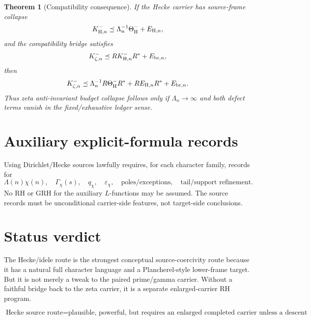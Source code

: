\documentclass[11pt]{article}
\newtheorem{theorem}{Theorem}
\begin{document}
\begin{theorem}[Compatibility consequence]
If the Hecke carrier has source-frame collapse
\[
K_{{\rm H},n}^-\preceq \Lambda_n^{-1}\Theta_{\rm H}^-+E_{{\rm H},n},
\]
and the compatibility bridge satisfies
\[
K_{\zeta,n}^-\preceq R K_{{\rm H},n}^-R^*+E_{{\rm br},n},
\]
then
\[
K_{\zeta,n}^-\preceq
\Lambda_n^{-1}R\Theta_{\rm H}^-R^*
+R E_{{\rm H},n}R^*+E_{{\rm br},n}.
\]
Thus zeta anti-invariant budget collapse follows only if \(\Lambda_n\to\infty\) and both defect terms vanish in the fixed/exhaustive ledger sense.
\end{theorem}

\section{Auxiliary explicit-formula records}
Using Dirichlet/Hecke sources lawfully requires, for each character family, records for
\[
\Lambda(n)\chi(n),\quad
\Gamma_\chi(s),\quad
q_\chi,\quad
\varepsilon_\chi,\quad
\text{poles/exceptions},\quad
\text{tail/support refinement}.
\]
No RH or GRH for the auxiliary \(L\)-functions may be assumed.  The source records must be unconditional carrier-side features, not target-side conclusions.

\section{Status verdict}
The Hecke/idele route is the strongest conceptual source-coercivity route because it has a natural full character language and a Plancherel-style lower-frame target.  But it is not merely a tweak to the paired prime/gamma carrier.  Without a faithful bridge back to the zeta carrier, it is a separate enlarged-carrier RH program.

\[
\boxed{
\text{Hecke source route}=
\text{plausible, powerful, but requires an enlarged completed carrier unless a descent bridge is proved.}
}
\]
\end{document}
